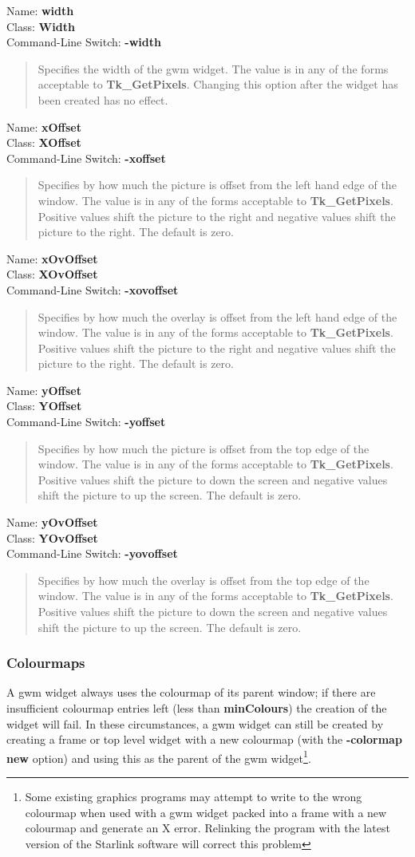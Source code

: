 \documentclass[twoside,11pt,nolof]{starlink}
\providecommand{\option}[3]{\par
Name: {\textbf{#1}} \\
Class: {\textbf{#2}} \\
Command-Line Switch: {\textbf{#3}} }
\newenvironment{rquote}{\begin{quote}\raggedright}{\end{quote}}
\begin{document}
\option{width}{Width}{-width}
\begin{rquote}
Specifies the width of the gwm widget. The value is in any of the forms
acceptable to \textbf{Tk\_GetPixels}. Changing this option after the widget
has been created has no effect.
\end{rquote}

\option{xOffset}{XOffset}{-xoffset}
\begin{rquote}
Specifies by how much the picture is offset from the left hand edge of the
window. The value is in any of the forms acceptable to \textbf{Tk\_GetPixels}.
Positive values shift the picture to the right and negative values shift the
picture to the right. The default is zero.
\end{rquote}

\option{xOvOffset}{XOvOffset}{-xovoffset}
\begin{rquote}
Specifies by how much the overlay is offset from the left hand edge of the
window. The value is in any of the forms acceptable to \textbf{Tk\_GetPixels}.
Positive values shift the picture to the right and negative values shift the
picture to the right. The default is zero.
\end{rquote}

\option{yOffset}{YOffset}{-yoffset}
\begin{rquote}
Specifies by how much the picture is offset from the top edge of the
window. The value is in any of the forms acceptable to \textbf{Tk\_GetPixels}.
Positive values shift the picture to down the screen and negative values
shift the picture to up the screen. The default is zero.
\end{rquote}

\option{yOvOffset}{YOvOffset}{-yovoffset}
\begin{rquote}
Specifies by how much the overlay is offset from the top edge of the
window. The value is in any of the forms acceptable to \textbf{Tk\_GetPixels}.
Positive values shift the picture to down the screen and negative values
shift the picture to up the screen. The default is zero.
\end{rquote}

\subsubsection{Colourmaps}

A gwm widget always uses the colourmap of its parent window; if there
are insufficient colourmap entries left (less than \textbf{minColours})
the creation of the widget will fail. In these circumstances, a gwm
widget can still be created by creating a frame or top level widget
with a new colourmap (with the \textbf{-colormap new} option) and using
this as the parent of the gwm widget\footnote{Some existing graphics
programs may attempt to write to the wrong colourmap when used with a
gwm widget packed into a frame with a new colourmap and generate an X
error. Relinking the program with the latest version of the Starlink
software will correct this problem}.
\end{document}
